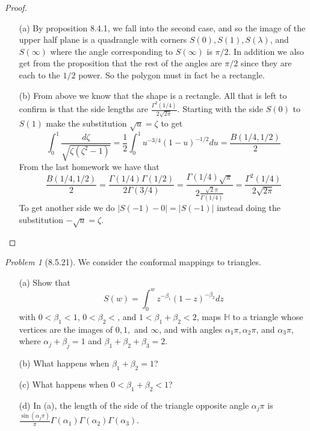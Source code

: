 \documentclass[10pt]{article}
\newcommand{\sk}{\vskip 10mm}
\newcommand{\bb}[1]{\mathbb{#1}}
\theoremstyle{remark}
\newtheorem{problem}{Problem}
\theoremstyle{remark}
\begin{document}
\begin{proof}
  \begin{enumerate}
  \item[(a)] By proposition 8.4.1, we fall into the second case, and so the
    image of the upper half plane is a quadrangle with corners $S(0),S(1),S(\lambda)$, and
    $S(\infty)$ where the angle corresponding to $S(\infty)$ is $\pi/2$. In addition we also get
    from the proposition that the rest of the angles are $\pi/2$ since they are each to
    the $1/2$ power. So the polygon must in fact be a rectangle.
  \item[(b)] From above we know that the shape is a rectangle. All that is left
    to confirm is that the side lengths are $\frac{\Gamma^2(1/4)}{2\sqrt{2\pi}}$.
    Starting with the side $S(0)$ to $S(1)$ make the substitution $\sqrt{u}=\zeta$ to get
    \[
      \int_0^1\frac{d\zeta}{\sqrt{\zeta(\zeta^2-1)}}=\frac{1}{2}\int_0^1u^{-3/4}(1-u)^{-1/2}du = \frac{B(1/4,1/2)}{2}
    \]
    From the last homework we have that
    \[
      \frac{B(1/4,1/2)}{2}=\frac{\Gamma(1/4)\Gamma(1/2)}{2\Gamma(3/4)}=\frac{\Gamma(1/4)\sqrt{\pi}}{2\frac{\sqrt{2}\pi}{\Gamma(1/4)}}=\frac{\Gamma^2(1/4)}{2\sqrt{2\pi}}
    \]
    To get another side we do $|S(-1)-0|=|S(-1)|$ instead doing the substitution $-\sqrt{u}=\zeta$.
  \end{enumerate}
\end{proof}

\sk

\begin{problem}[8.5.21]
  We consider the conformal mappings to triangles.
  \begin{enumerate}
  \item[(a)] Show that
    \[
      S(w)=\int_0^w z^{-\beta_1}(1-z)^{-\beta_2}dz
    \]
    with $0<\beta_1<1$, $0<\beta_2<$, and $1<\beta_1+\beta_2<2$, maps $\bb{H}$
    to a triangle whose vertices are the images of $0,1,$ and
    $\infty$, and with angles $\alpha_1\pi,\alpha_2\pi$, and $\alpha_3\pi$,
    where $\alpha_j+\beta_j=1$ and $\beta_1+\beta_2+\beta_3=2$.
  \item[(b)] What happens when $\beta_1+\beta_2=1$?
  \item[(c)] What happens when $0<\beta_1+\beta_2<1$?
  \item[(d)] In (a), the length of the side of the triangle opposite angle
    $\alpha_j\pi$ is
    $\frac{\sin(\alpha_j\pi)}{\pi}\Gamma(\alpha_1)\Gamma(\alpha_2)\Gamma(\alpha_3)$.
  \end{enumerate}
\end{problem}
\end{document}
